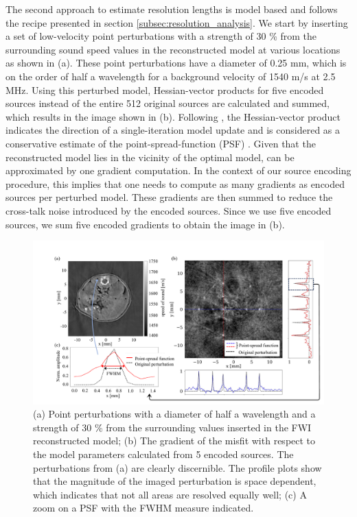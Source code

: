 \documentclass[12pt]{iopart}
\begin{document}
The second approach to estimate resolution lengths is model based and follows the recipe presented in section \ref{subsec:resolution_analysis}. We start by inserting a set of low-velocity point perturbations with a strength of 30 \% from the surrounding sound speed values in the reconstructed model at various locations as shown in (a). These point perturbations have a diameter of 0.25 mm, which is on the order of half a wavelength for a background velocity of 1540 m/s at 2.5 MHz. Using this perturbed model, Hessian-vector products for five encoded sources instead of the entire 512 original sources are calculated and summed, which results in the image shown in (b). Following , the Hessian-vector product indicates the direction of a single-iteration model update and is considered as a conservative estimate of the point-spread-function (PSF) \cite{Fichtner_Leeuwen_2015}. Given that the reconstructed model lies in the vicinity of the optimal model,  can be approximated by one gradient computation. In the context of our source encoding procedure, this implies that one needs to compute as many gradients as encoded sources per perturbed model. These gradients are then summed to reduce the cross-talk noise introduced by the encoded sources. Since we use five encoded sources, we sum five encoded gradients to obtain the image in (b).
 \begin{figure}[!h]
    \centering
    \includegraphics[width=\textwidth]{figure7.pdf}
    \caption{(a) Point perturbations with a diameter of half a wavelength and a strength of 30 \% from the surrounding values inserted in the FWI reconstructed model; (b) The gradient of the misfit with respect to the model parameters calculated from 5 encoded sources. The perturbations from (a) are clearly discernible. The profile plots show that the magnitude of the imaged perturbation is space dependent, which indicates that not all areas are resolved equally well; (c) A zoom on a PSF with the FWHM measure indicated.}
    \label{fig:mouseperturbation_PSFs}
\end{figure}
\end{document}
